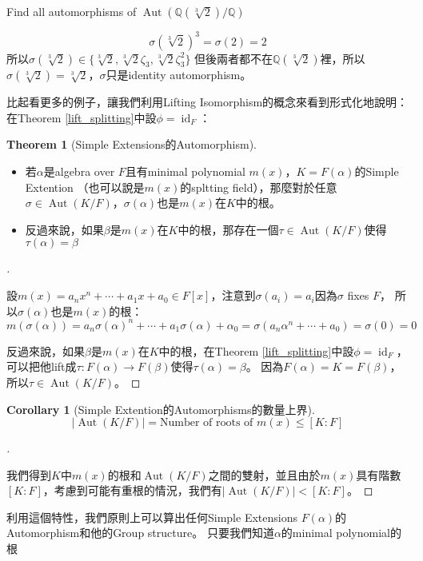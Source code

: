 \documentclass[12pt]{article}
\theoremstyle{definition}
\newtheorem{thm}{Theorem}
\newtheorem{cor}{Corollary}
\newenvironment{proofs}[1][\proofname]{%
  \begin{proof}[#1]$ $\par\nobreak\ignorespaces
}{%
  \end{proof}
}
\newcommand{\QQ}{\mathbb Q}
\DeclareMathOperator{\Aut}{Aut}
\DeclareMathOperator{\id}{id}
\begin{document}
\begin{ex} Find all automorphisms of $\Aut(\QQ(\sqrt[3]{2})/\QQ)$

	\[\sigma(\sqrt[3]{2})^3=\sigma(2)=2\]
	所以$\sigma(\sqrt[3]{2})\in \{\sqrt[3]{2},\sqrt[3]{2}\zeta_3, \sqrt[3]{2}\zeta_3^2\}$
	但後兩者都不在$\QQ(\sqrt[3]{2})$裡，所以$\sigma(\sqrt[3]{2})=\sqrt[3]{2}$，$\sigma$只是identity automorphism。

\end{ex}

比起看更多的例子，讓我們利用Lifting Isomorphism的概念來看到形式化地說明：在Theorem \ref{lift_splitting}中設$\phi=\id_F$：
\begin{thm}[Simple Extensions的Automorphism]\leavevmode
	\begin{itemize}
		\item 若$\alpha$是algebra over $F$且有minimal polynomial $m(x)$，$K=F(\alpha)$的Simple Extention
		      （也可以說是$m(x)$的spltting field），那麼對於任意$\sigma\in\Aut(K/F)$，$\sigma(\alpha)$也是$m(x)$在$K$中的根。
		\item 反過來說，如果$\beta$是$m(x)$在$K$中的根，那存在一個$\tau\in\Aut(K/F)$使得$\tau(\alpha)=\beta$

	\end{itemize}\end{thm}

\begin{proofs}
	設$m(x)=a_n x^n+\cdots+a_1x+ a_0\in F[x]$，注意到$\sigma(a_i)=a_i$因為$\sigma$ fixes $F$，
	所以$\sigma(\alpha)$也是$m(x)$的根：
	\[m(\sigma(\alpha))=a_n\sigma(\alpha)^n+\cdots+a_1 \sigma(\alpha)+\alpha_0=\sigma(a_n \alpha^n +\cdots + a_0)=\sigma(0)=0\]

	反過來說，如果$\beta$是$m(x)$在$K$中的根，在Theorem \ref{lift_splitting}中設$\phi=\id_F$，可以把他lift成$\tau:F(\alpha)\to F(\beta)$使得$\tau(\alpha)=\beta$。
	因為$F(\alpha)=K=F(\beta)$，所以$\tau\in\Aut(K/F)$。
\end{proofs}

\begin{cor}[Simple Extention的Automorphisms的數量上界]
	$$\left|\Aut(K/F)\right|=\text{Number of roots of $m(x)$}\le [K:F]$$
\end{cor}
\begin{proofs}
	我們得到$K$中$m(x)$的根和$\Aut(K/F)$之間的雙射，並且由於$m(x)$具有階數$[K: F]$，考慮到可能有重根的情況，我們有$\left|\Aut(K/F)\right| < [K: F]$。
\end{proofs}

利用這個特性，我們原則上可以算出任何Simple Extensions $F(\alpha)$的Automorphism和他的Group structure。
只要我們知道$\alpha$的minimal polynomial的根
\end{document}
